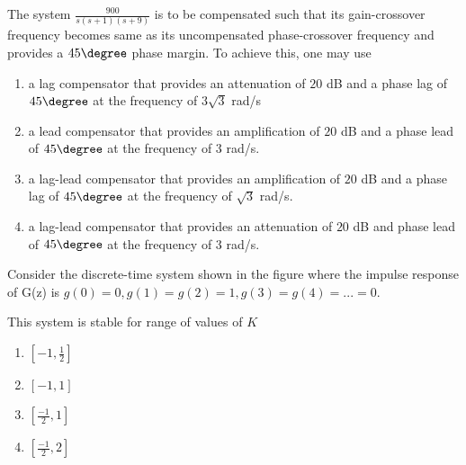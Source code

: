 \iffalse
\chapter{2007}
\author{AI24BTECH11027}
\section{ee}
\fi

\item The system $\frac{900}{s(s+1)(s+9)}$ is to be compensated such that its gain-crossover frequency becomes same as its uncompensated phase-crossover frequency and provides a $45 \degree$ phase margin. To achieve this, one may use 
\begin{enumerate}
    \item a lag compensator that provides an attenuation of $20$ dB and a phase lag of $45\degree$ at the frequency of $3\sqrt{3}$ rad/s
    \item a lead compensator that provides an amplification of $20$ dB and a phase lead of $45 \degree$ at the frequency of $3$ rad/s.
    \item a lag-lead compensator that provides an amplification of $20$ dB and a phase lag of $45 \degree$ at the frequency of $\sqrt{3}$ rad/s.
    \item a lag-lead compensator that provides an attenuation of $20$ dB and phase lead of $45 \degree$ at the frequency of $3$ rad/s.\\
\end{enumerate} 

\item Consider the discrete-time system shown in the figure where the impulse response of G(z) is $g(0)=0, g(1)=g(2)=1, g(3)=g(4)=...=0.$ \\

 This system is stable for range of values of $K$ 
 
\begin{enumerate}
\item $[-1, \frac{1}{2}]$
\item $[-1, 1]$
\item $[\frac{-1}{2}, 1]$
\item $[\frac{-1}{2}, 2]$\\
\end{enumerate} 

